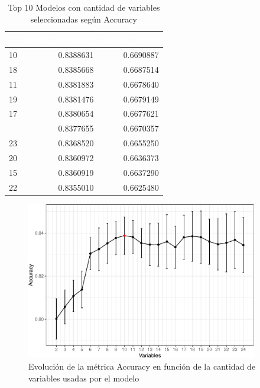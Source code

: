\begin{table}[!h]
	
	\caption{\label{tab:top_10_rfe_accuracy}Top 10 Modelos con cantidad de variables seleccionadas según Accuracy}
	\centering
	\begin{tabular}[t]{rrr}
		\toprule
		\rowcolor{black}  \multicolumn{1}{c}{\textcolor{white}{\textbf{Variables}}} & \multicolumn{1}{c}{\textcolor{white}{\textbf{media\_accuracy}}} & \multicolumn{1}{c}{\textcolor{white}{\textbf{media\_kappa}}}\\
		\midrule
		\rowcolor{gray!6}  10 & 0.8388631 & 0.6690887\\
		18 & 0.8385668 & 0.6687514\\
		\rowcolor{gray!6}  11 & 0.8381883 & 0.6678640\\
		19 & 0.8381476 & 0.6679149\\
		\rowcolor{gray!6}  17 & 0.8380654 & 0.6677621\\
		\addlinespace
		9 & 0.8377655 & 0.6670357\\
		\rowcolor{gray!6}  23 & 0.8368520 & 0.6655250\\
		20 & 0.8360972 & 0.6636373\\
		\rowcolor{gray!6}  15 & 0.8360919 & 0.6637290\\
		22 & 0.8355010 & 0.6625480\\
		\bottomrule
	\end{tabular}
\end{table}

\begin{figure}[!htb]
	\centering
	\includegraphics[width=0.9\textwidth]{imagenes/variables/rfe_evolucion_accuracy-1.pdf}
	\caption{Evolución de la métrica Accuracy en función de la cantidad de variables usadas por el modelo}
	\label{fig:rfe_evolucion_accuracy}
\end{figure}


